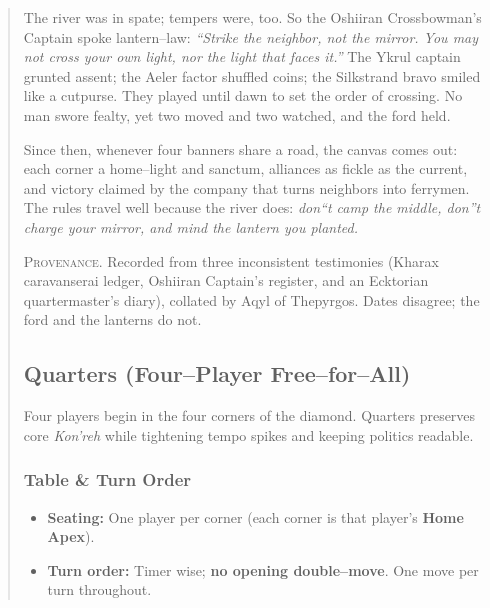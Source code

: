 \documentclass[11pt]{article}
\begin{document}
\begin{quote}
\begin{tcolorbox}[enhanced,breakable,
  colback=royal!3, colframe=royal!70!black, boxrule=0.6pt,
  left=6pt, right=6pt, top=6pt, bottom=6pt]
The river was in spate; tempers were, too. So the Oshiiran Crossbowman's Captain spoke lantern--law: \emph{``Strike the neighbor, not the mirror. You may not cross your own light, nor the light that faces it.''} The Ykrul captain grunted assent; the Aeler factor shuffled coins; the Silkstrand bravo smiled like a cutpurse. They played until dawn to set the order of crossing. No man swore fealty, yet two moved and two watched, and the ford held.

Since then, whenever four banners share a road, the canvas comes out: each corner a home--light and sanctum, alliances as fickle as the current, and victory claimed by the company that turns neighbors into ferrymen. The rules travel well because the river does: \emph{don``t camp the middle, don''t charge your mirror, and mind the lantern you planted.} 
\medskip

\noindent\textsc{Provenance.} Recorded from three inconsistent testimonies (Kharax caravanserai ledger, Oshiiran Captain's register, and an Ecktorian quartermaster's diary), collated by Aqyl of Thepyrgos. Dates disagree; the ford and the lanterns do not.
\end{tcolorbox}

\subsection{Quarters (Four--Player Free--for--All)}
\label{sec:quarters}

\noindent Four players begin in the four corners of the diamond. Quarters preserves core \emph{Kon'reh} while tightening tempo spikes and keeping politics readable.

\subsubsection*{Table \& Turn Order}
\begin{itemize}[leftmargin=1.3em,itemsep=0.25em]
  \item \textbf{Seating:} One player per corner (each corner is that player's \textbf{Home Apex}).
  \item \textbf{Turn order:} Timer wise; \textbf{no opening double--move}. One move per turn throughout.
\end{itemize}


\end{quote}
\end{document}
